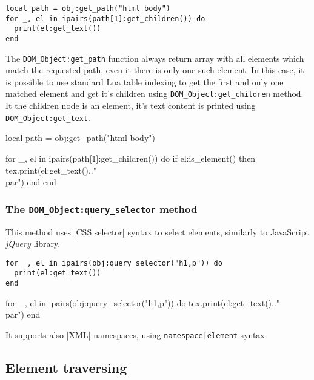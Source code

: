 \documentclass{ltxdoc}
\begin{document}
\begin{verbatim}
local path = obj:get_path("html body")
for _, el in ipairs(path[1]:get_children()) do
  print(el:get_text())
end
\end{verbatim}

The \verb|DOM_Object:get_path| function always return array with all elements
which match the requested path, even it there is only one such element. In this
case, it is possible to use standard Lua table indexing to get the first and
only one matched element and get it's children using
\verb|DOM_Object:get_children| method. It the children node is an element, it's
text content is printed using \verb|DOM_Object:get_text|.



\begin{framed}
  \begin{luacode*}
local path = obj:get_path("html body")

for _, el in ipairs(path[1]:get_children()) do
  if el:is_element() then
    tex.print(el:get_text().."\\par")
  end
end
  \end{luacode*}
\end{framed}

\subsubsection{The \texttt{DOM\_Object:query\_selector} method}

This method uses |CSS selector| syntax to select elements, similarly to JavaScript \textit{jQuery} library.

\begin{verbatim}
for _, el in ipairs(obj:query_selector("h1,p")) do
  print(el:get_text())
end
\end{verbatim}


\begin{framed}
  \begin{luacode*}
for _, el in ipairs(obj:query_selector("h1,p")) do
  tex.print(el:get_text().."\\par")
end
  \end{luacode*}
\end{framed}

It supports also |XML| namespaces, using \verb_namespace|element_ syntax.

\subsection{Element traversing}
\end{document}
